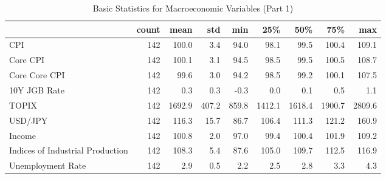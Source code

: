 \documentclass[a4paper,12pt]{article}
\begin{document}
        
        \begin{landscape}
        \begin{table}
\caption{Basic Statistics for Macroeconomic Variables (Part 1)}
\label{tab:statistics_Macroeconomic_Variables_(Part_1)}
\begin{tabular}{lrrrrrrrr}
\toprule
 & count & mean & std & min & 25\% & 50\% & 75\% & max \\
\midrule
CPI & 142 & 100.0 & 3.4 & 94.0 & 98.1 & 99.5 & 100.4 & 109.1 \\
Core CPI & 142 & 100.1 & 3.1 & 94.5 & 98.5 & 99.5 & 100.5 & 108.7 \\
Core Core CPI & 142 & 99.6 & 3.0 & 94.2 & 98.5 & 99.2 & 100.1 & 107.5 \\
10Y JGB Rate & 142 & 0.3 & 0.3 & -0.3 & 0.0 & 0.1 & 0.5 & 1.1 \\
TOPIX & 142 & 1692.9 & 407.2 & 859.8 & 1412.1 & 1618.4 & 1900.7 & 2809.6 \\
USD/JPY & 142 & 116.3 & 15.7 & 86.7 & 106.4 & 111.3 & 121.2 & 160.9 \\
Income & 142 & 100.8 & 2.0 & 97.0 & 99.4 & 100.4 & 101.9 & 109.2 \\
Indices of Industrial Production & 142 & 108.3 & 5.4 & 87.6 & 105.0 & 109.7 & 112.5 & 116.9 \\
Unemployment Rate & 142 & 2.9 & 0.5 & 2.2 & 2.5 & 2.8 & 3.3 & 4.3 \\
\bottomrule
\end{tabular}
\end{table}

        \end{landscape}
        
        
\end{document}
